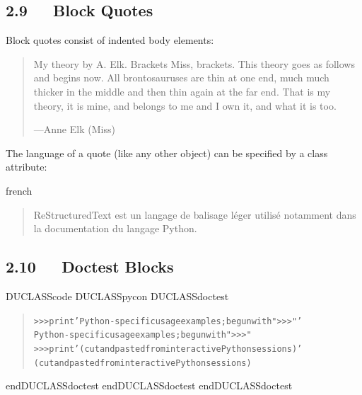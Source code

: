 \documentclass[a4paper]{article}
\newenvironment{DUclass}[1]%
    {%
     \def\DocutilsClassFunctionName{DUCLASS#1}
     \csname \DocutilsClassFunctionName \endcsname}%
    {\csname end\DocutilsClassFunctionName \endcsname}%
\begin{document}
\subsection{2.9   Block Quotes}

Block quotes consist of indented body elements:

\begin{quote}
My theory by A. Elk.  Brackets Miss, brackets.  This theory goes
as follows and begins now.  All brontosauruses are thin at one
end, much much thicker in the middle and then thin again at the
far end.  That is my theory, it is mine, and belongs to me and I
own it, and what it is too.
\nopagebreak

\raggedleft —Anne Elk (Miss)
\end{quote}

The language of a quote (like any other object) can be specified by
a class attribute:

% 

\begin{selectlanguage}{french}
\begin{quote}
ReStructuredText est un langage de balisage léger utilisé
notamment dans la documentation du langage Python.
\end{quote}
\end{selectlanguage}


\subsection{2.10   Doctest Blocks}

\begin{DUclass}{code}
\begin{DUclass}{pycon}
\begin{DUclass}{doctest}
\begin{quote}
\begin{alltt}
>>> print 'Python-specific usage examples; begun with ">>>"'
Python-specific usage examples; begun with ">>>"
>>> print '(cut and pasted from interactive Python sessions)'
(cut and pasted from interactive Python sessions)
\end{alltt}
\end{quote}
\end{DUclass}
\end{DUclass}
\end{DUclass}
\end{document}
